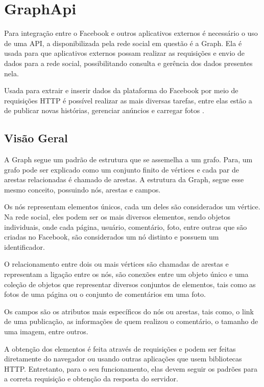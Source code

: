 \chapter[GraphApi]{GraphApi}
Para integração entre o Facebook e outros aplicativos externos é necessário o uso de uma API, a disponibilizada pela rede social em questão é a Graph. Ela é usada para que aplicativos externos possam realizar as requisições e envio de dados para a rede social, possibilitando consulta e gerência dos dados presentes nela. 

Usada para extrair e inserir dados da plataforma do Facebook por meio de requisições HTTP é possível realizar as mais diversas tarefas, entre elas estão a de publicar novas histórias, gerenciar anúncios e carregar fotos \cite{facebook2018b}.

\section{Visão Geral}
A Graph segue um padrão de estrutura que se assemelha a um grafo. Para\cite{soares2014}, um grafo pode ser explicado como um conjunto finito de vértices e cada par de arestas relacionadas é chamado de arestas. A estrutura da Graph, segue esse mesmo conceito, possuindo nós, arestas e campos. 

Os nós representam elementos únicos, cada um deles são considerados um vértice. Na rede social, eles podem ser os mais diversos elementos, sendo objetos individuais, onde cada página, usuário, comentário, foto, entre outras que são criadas no Facebook, são considerados um nó distinto \cite{facebook2018b} e possuem um identificador. 

O relacionamento entre dois ou mais vértices são chamadas de arestas e representam a ligação entre os nós, são conexões entre um objeto único e uma coleção de objetos que representar diversos conjuntos de elementos, tais como as fotos de uma página ou o conjunto de comentários em uma foto. 

Os campos são os atributos mais específicos do nós ou arestas, tais como, o link de uma publicação, as informações de quem realizou o comentário, o tamanho de uma imagem, entre outros.

A obtenção dos elementos é feita através de requisições e podem ser feitas diretamente do navegador ou usando outras aplicações que usem bibliotecas HTTP. Entretanto, para o seu funcionamento, elas devem seguir os padrões para a correta requisição e obtenção da resposta do servidor. 


